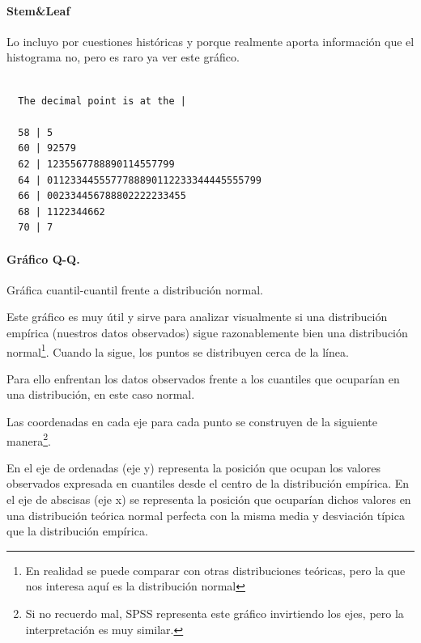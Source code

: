 \documentclass[
  letterpaper,
  DIV=11,
  numbers=noendperiod]{scrreprt}
\let\oldparagraph\paragraph
\renewcommand{\paragraph}[1]{\oldparagraph{#1}\mbox{}}
\newenvironment{Shaded}{\begin{snugshade}}{\end{snugshade}}
\newcommand{\FunctionTok}[1]{\textcolor[rgb]{0.28,0.35,0.67}{#1}}
\newcommand{\NormalTok}[1]{\textcolor[rgb]{0.00,0.23,0.31}{#1}}
\newcommand{\SpecialCharTok}[1]{\textcolor[rgb]{0.37,0.37,0.37}{#1}}
\begin{document}
\hypertarget{stemleaf}{%
\paragraph{Stem\&Leaf}\label{stemleaf}}

Lo incluyo por cuestiones históricas y porque realmente aporta
información que el histograma no, pero es raro ya ver este gráfico.

\begin{Shaded}
\end{Shaded}

\begin{verbatim}

  The decimal point is at the |

  58 | 5
  60 | 92579
  62 | 1235567788890114557799
  64 | 0112334455577788890112233344445555799
  66 | 002334456788802222233455
  68 | 1122344662
  70 | 7
\end{verbatim}

\hypertarget{gruxe1fico-q-q.}{%
\paragraph{Gráfico Q-Q.}\label{gruxe1fico-q-q.}}

Gráfica cuantil-cuantil frente a distribución normal.

Este gráfico es muy útil y sirve para analizar visualmente si una
distribución empírica (nuestros datos observados) sigue razonablemente
bien una distribución normal\footnote{En realidad se puede comparar con
  otras distribuciones teóricas, pero la que nos interesa aquí es la
  distribución normal}. Cuando la sigue, los puntos se distribuyen cerca
de la línea.

Para ello enfrentan los datos observados frente a los cuantiles que
ocuparían en una distribución, en este caso normal.

Las coordenadas en cada eje para cada punto se construyen de la
siguiente manera\footnote{Si no recuerdo mal, SPSS representa este
  gráfico invirtiendo los ejes, pero la interpretación es muy similar.}.

En el eje de ordenadas (eje y) representa la posición que ocupan los
valores observados expresada en cuantiles desde el centro de la
distribución empírica. En el eje de abscisas (eje x) se representa la
posición que ocuparían dichos valores en una distribución teórica normal
perfecta con la misma media y desviación típica que la distribución
empírica.
\end{document}
